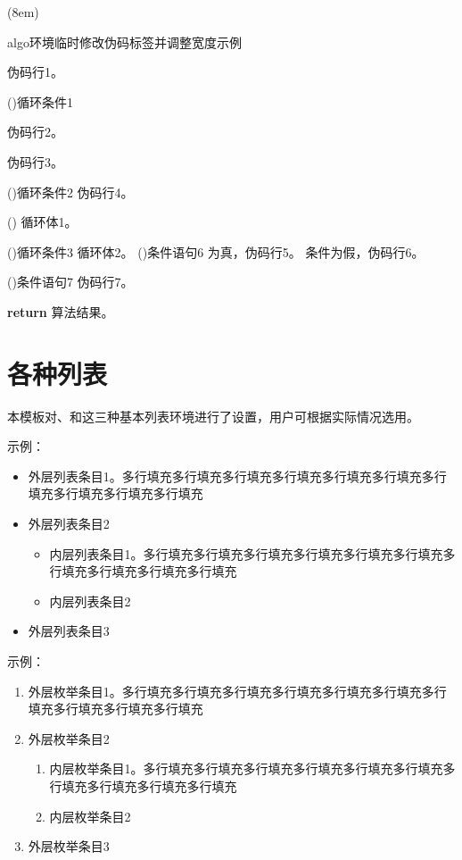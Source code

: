 \documentclass[print, doctor, vlined]{DissertUESTC}
\begin{document}
	\begin{algo}[!h](8em)
		\renewcommand{\algorithmcfname}{过程}  %
		\caption{algo环境临时修改伪码标签并调整宽度示例} \label{alg: algo环境修改伪码标签并调整宽度示例}
		伪码行1。
		
		\For(){循环条件1}{
			伪码行2。
			
			伪码行3。
			
			\DoWhile(){循环条件2}{
				伪码行4。
			}
			
			\Loop(){
				循环体1。
			}
			
			\Repeat(){循环条件3}{
				循环体2。
			}
			\eIf(){条件语句6}{
				为真，伪码行5。
			}{
				条件为假，伪码行6。
			}
			
			\If(){条件语句7}{
				伪码行7。
			}
		}
		\textbf{return} 算法结果。
	\end{algo}

	\clearpage
	\section{各种列表}

	本模板对、和这三种基本列表环境进行了设置，用户可根据实际情况选用。

	示例：

	\begin{itemize}
		\item 外层列表条目1。多行填充多行填充多行填充多行填充多行填充多行填充多行填充多行填充多行填充多行填充
		\item 外层列表条目2
		\begin{itemize}
			\item 内层列表条目1。多行填充多行填充多行填充多行填充多行填充多行填充多行填充多行填充多行填充多行填充
			\item 内层列表条目2
		\end{itemize}
		\item 外层列表条目3
	\end{itemize}

	\null

	示例：

	\begin{enumerate}
		\item 外层枚举条目1。多行填充多行填充多行填充多行填充多行填充多行填充多行填充多行填充多行填充多行填充
		\item 外层枚举条目2
		\begin{enumerate}
			\item 内层枚举条目1。多行填充多行填充多行填充多行填充多行填充多行填充多行填充多行填充多行填充多行填充
			\item 内层枚举条目2
		\end{enumerate}
		\item 外层枚举条目3
	\end{enumerate}
\end{document}

